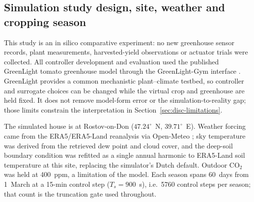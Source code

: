 \subsection{Simulation study design, site, weather and cropping season}
\label{sec:sim}

This study is an in silico comparative experiment: no new greenhouse sensor records,
plant measurements, harvested-yield observations or actuator trials were collected. All
controller development and evaluation used the published GreenLight tomato greenhouse
model \cite{katzin2020,katzin2021} through the GreenLight-Gym interface
\cite{vanlaatum2025}. GreenLight provides a common mechanistic plant--climate testbed, so
controller and surrogate choices can be changed while the virtual crop and greenhouse are
held fixed. It does not remove model-form error or the simulation-to-reality gap; those
limits constrain the interpretation in Section~\ref{sec:disc-limitations}.

The simulated house is at Rostov-on-Don ($47.24^{\circ}$~N, $39.71^{\circ}$~E). Weather
forcing came from the ERA5/ERA5-Land reanalysis \cite{hersbach2020} via Open-Meteo
\cite{openmeteo2023}; sky temperature was derived from the retrieved dew point and cloud
cover, and the deep-soil boundary condition was refitted as a single annual harmonic to
ERA5-Land soil temperature at this site, replacing the simulator's Dutch default.
Outdoor CO$_2$ was held at 400~ppm, a limitation of the model. Each season spans
60~days from 1~March at a 15-min control step ($T_s=900$~s), i.e.\ 5760 control steps
per season; that count is the truncation gate used throughout.

